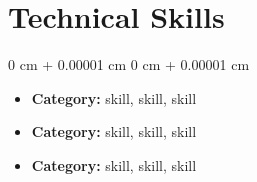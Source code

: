 \documentclass[10pt, letterpaper]{article}
\newenvironment{highlightsforbulletentries}{
    \begin{itemize}[
        topsep=0.10 cm,
        parsep=0.10 cm,
        partopsep=0pt,
        itemsep=0pt,
        leftmargin=10pt
    ]
}{
    \end{itemize}
} %
\newenvironment{onecolentry}{
    \begin{adjustwidth}{
        0 cm + 0.00001 cm
    }{
        0 cm + 0.00001 cm
    }
}{
    \end{adjustwidth}
} %
\begin{document}
    \section{Technical Skills}
    \begin{onecolentry}
        \begin{highlightsforbulletentries}
            \item \textbf{Category:} skill, skill, skill
            \item \textbf{Category:} skill, skill, skill
            \item \textbf{Category:} skill, skill, skill
        \end{highlightsforbulletentries}
    \end{onecolentry}
\end{document}
